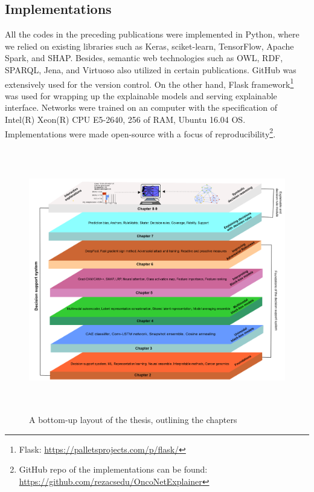 \subsection{Implementations}
All the codes in the preceding publications were implemented in Python, where we relied on existing libraries such as Keras, sciket-learn, TensorFlow, Apache Spark, and SHAP. %
Besides, semantic web technologies such as OWL, RDF, SPARQL, Jena, and Virtuoso also utilized in certain publications. GitHub was extensively used for the  version control. On the other hand, Flask framework\footnote{Flask: \url{https://palletsprojects.com/p/flask/}} was used for wrapping up the explainable models and serving  explainable interface. Networks were trained on an computer with the specification of Intel(R) Xeon(R) CPU E5-2640, 256 of RAM, Ubuntu 16.04 OS. Implementations were made open-source with a focus of reproducibility\footnote{GitHub repo of the implementations can be found: \url{https://github.com/rezacsedu/OncoNetExplainer}}.

\begin{figure}
	\centering
		\includegraphics[width=0.9\linewidth,height=115mm]{images/chapter_outline.png}
		\caption{A bottom-up layout of the thesis, outlining the chapters}
        \label{fig:chapter_organization}
\end{figure}

